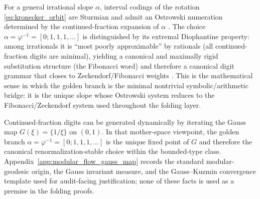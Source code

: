 \begin{remark}\label{rem:golden_branch_principled}
For a general irrational slope $\alpha$, interval codings of the rotation \eqref{eq:kronecker_orbit} are Sturmian and admit an Ostrowski numeration determined by the continued-fraction expansion of $\alpha$ \cite{Lothaire2002,AlloucheShallit2003}.
The choice $\alpha=\varphi^{-1}=[0;1,1,1,\dots]$ is distinguished by its extremal Diophantine property: among irrationals it is ``most poorly approximable'' by rationals (all continued-fraction digits are minimal), yielding a canonical and maximally rigid substitution structure (the Fibonacci word) and therefore a canonical digit grammar that closes to Zeckendorf/Fibonacci weights \cite{HardyWright2008,Lothaire2002}.
This is the mathematical sense in which the golden branch is the minimal nontrivial symbolic/arithmetic bridge: it is the unique slope whose Ostrowski system reduces to the Fibonacci/Zeckendorf system used throughout the folding layer.
\end{remark}
\begin{remark}\label{rem:gauss_map_fixed_point}
\AuditTag Continued-fraction digits can be generated dynamically by iterating the Gauss map $G(\xi)=\{1/\xi\}$ on $(0,1)$.
In that mother-space viewpoint, the golden branch $\alpha=\varphi^{-1}=[0;1,1,1,\dots]$ is the unique fixed point of $G$ and therefore the canonical renormalization-stable choice within the bounded-type class.
Appendix~\ref{app:modular_flow_gauss_map} records the standard modular-geodesic origin, the Gauss invariant measure, and the Gauss--Kuzmin convergence template used for audit-facing justification; none of these facts is used as a premise in the folding proofs.
\end{remark}

